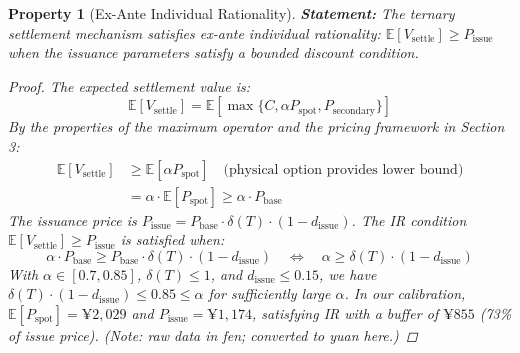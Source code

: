 \documentclass[12pt,a4paper]{article}
\newtheorem{property}{Property}
\begin{document}
\begin{property}[Ex-Ante Individual Rationality]
\label{prop:ir}
\textbf{Statement:} The ternary settlement mechanism satisfies ex-ante individual rationality: $\mathbb{E}[V_{\text{settle}}] \geq P_{\text{issue}}$ when the issuance parameters satisfy a bounded discount condition.

\begin{proof}
The expected settlement value is:
\begin{equation}
    \mathbb{E}[V_{\text{settle}}] = \mathbb{E}[\max\{C, \alpha P_{\text{spot}}, P_{\text{secondary}}\}]
\end{equation}
By the properties of the maximum operator and the pricing framework in Section 3:
\begin{align}
    \mathbb{E}[V_{\text{settle}}] &\geq \mathbb{E}[\alpha P_{\text{spot}}] \quad \text{(physical option provides lower bound)} \\
    &= \alpha \cdot \mathbb{E}[P_{\text{spot}}] \geq \alpha \cdot P_{\text{base}}
\end{align}
The issuance price is $P_{\text{issue}} = P_{\text{base}} \cdot \delta(T) \cdot (1 - d_{\text{issue}})$.
The IR condition $\mathbb{E}[V_{\text{settle}}] \geq P_{\text{issue}}$ is satisfied when:
\begin{equation}
    \alpha \cdot P_{\text{base}} \geq P_{\text{base}} \cdot \delta(T) \cdot (1 - d_{\text{issue}}) \quad\Longleftrightarrow\quad \alpha \geq \delta(T) \cdot (1 - d_{\text{issue}})
\end{equation}
With $\alpha \in [0.7, 0.85]$, $\delta(T) \leq 1$, and $d_{\text{issue}} \leq 0.15$, we have $\delta(T) \cdot (1 - d_{\text{issue}}) \leq 0.85 \leq \alpha$ for sufficiently large $\alpha$.
In our calibration, $\mathbb{E}[P_{\text{spot}}] = \yen 2,029$ and $P_{\text{issue}} = \yen 1,174$, satisfying IR with a buffer of $\yen 855$ (73\% of issue price). (Note: raw data in \textit{fen}; converted to yuan here.)
\end{proof}
\end{property}
\end{document}
